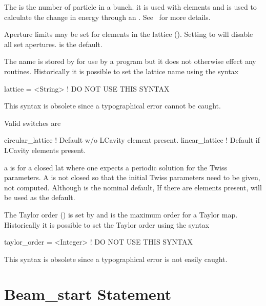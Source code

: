 The  is the number of particle in a bunch.
it is used with  elements and is used to calculate the
change in energy through an . See~ for more
details.

Aperture limits may be set for elements in the lattice
(). Setting  to  will
disable all set apertures.  is the default.

The  name is stored by \bmad for use by a program but it does
not otherwise effect any \bmad routines. 
Historically it is possible to set the lattice name using the syntax
\begin{example}
  lattice = <String>   ! DO NOT USE THIS SYNTAX
\end{example}
This syntax is obsolete since a typographical error cannot be caught.

\noindent
{}
Valid  switches are
\begin{example}
  circular_lattice  ! Default w/o LCavity element present.
  linear_lattice    ! Default if LCavity elements present.
\end{example}
a  is for a closed lat where one expects a
periodic solution for the Twiss parameters. A  is
not closed so that the initial Twiss parameters need to be given, not
computed. Although  is the nominal default, If
there are  elements present,  will be used
as the default.

The Taylor order () is set by
 and is the maximum order for a Taylor map.
Historically it is possible to set the Taylor order using the syntax
\begin{example}
  taylor_order = <Integer>   ! DO NOT USE THIS SYNTAX
\end{example}
This syntax is obsolete since a typographical error is not easily caught.

\section{Beam_start Statement}
\label{s:beam.start}


